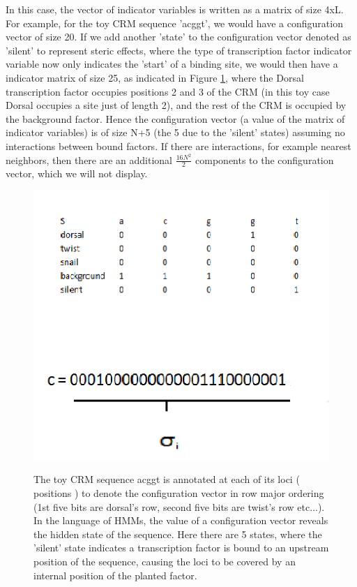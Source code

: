 In this case, the vector of indicator variables is written as a matrix of size 4xL.  For example, for the toy CRM sequence 'acggt', we would have a configuration vector of size 20.  If we add another 'state' to the configuration vector denoted as 'silent' to represent steric effects, where the type of transcription factor indicator variable now only indicates the 'start' of a binding site, we would then have a indicator matrix of size 25, as indicated in Figure \ref{configurationMatrixI}, where the Dorsal transcription factor occupies positions 2 and 3 of the CRM (in this toy case Dorsal occupies a site just of length 2), and the rest of the CRM is occupied by the background factor.  Hence the configuration vector (a value of the matrix of indicator variables) is of size N+5 (the 5  due to the 'silent' states) assuming no interactions between bound factors.  If there are interactions, for example nearest neighbors, then there are an additional $\frac{16N^2}{2}$ components to the configuration vector, which we will not display.
 
\begin{figure}
  \includegraphics[width=1\textwidth]{configurationMatrixIb}\\
  \caption{The toy CRM sequence acggt is annotated at each of its loci ( positions ) to denote the configuration vector in row major ordering (1st five bits are dorsal's row, second five bits are twist's row etc...).  In the language of HMMs, the value of a configuration vector reveals the hidden state of the sequence.  Here there are 5 states, where the 'silent' state indicates a transcription factor is bound to an upstream position of the sequence, causing the loci to be covered by an internal position of the planted factor.  }\label{configurationMatrixI}
\end{figure}

